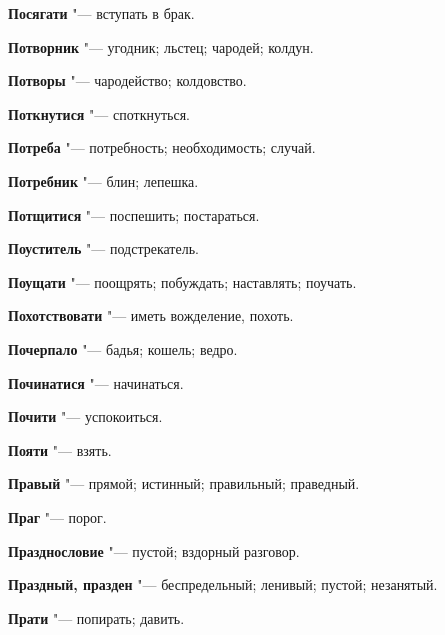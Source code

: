 \begin{mymulticols}{2}
\noindent\textbf{Посягати} "--- вступать в брак. 




\noindent\textbf{Потворник} "--- угодник; льстец; чародей; колдун. 




\noindent\textbf{Потворы} "--- чародейство; колдовство. 




\noindent\textbf{Поткнутися} "--- споткнуться. 




\noindent\textbf{Потреба} "--- потребность; необходимость; случай. 




\noindent\textbf{Потребник} "--- блин; лепешка. 




\noindent\textbf{Потщитися} "--- поспешить; постараться. 




\noindent\textbf{Поуститель} "--- подстрекатель. 




\noindent\textbf{Поущати} "--- поощрять; побуждать; наставлять; поучать. 




\noindent\textbf{Похотствовати} "--- иметь вожделение, похоть. 




\noindent\textbf{Почерпало} "--- бадья; кошель; ведро. 




\noindent\textbf{Починатися} "--- начинаться. 




\noindent\textbf{Почити} "--- успокоиться. 




\noindent\textbf{Пояти} "--- взять. 




\noindent\textbf{Правый} "--- прямой; истинный; правильный; праведный. 




\noindent\textbf{Праг} "--- порог. 

\noindent\textbf{Празднословие} "--- пустой; вздорный разговор. 



\noindent\textbf{Праздный, празден} "--- беспредельный; ленивый; пустой; незанятый. 




\noindent\textbf{Прати} "--- попирать; давить. 





\end{mymulticols}
